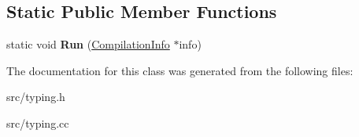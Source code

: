 \subsection*{Static Public Member Functions}
\begin{DoxyCompactItemize}
\item 
\hypertarget{classv8_1_1internal_1_1_ast_typer_aafa5f5ac0e6ee1af07c03fcb4bc58603}{}static void {\bfseries Run} (\hyperlink{classv8_1_1internal_1_1_compilation_info}{Compilation\+Info} $\ast$info)\label{classv8_1_1internal_1_1_ast_typer_aafa5f5ac0e6ee1af07c03fcb4bc58603}

\end{DoxyCompactItemize}


The documentation for this class was generated from the following files\+:\begin{DoxyCompactItemize}
\item 
src/typing.\+h\item 
src/typing.\+cc\end{DoxyCompactItemize}
